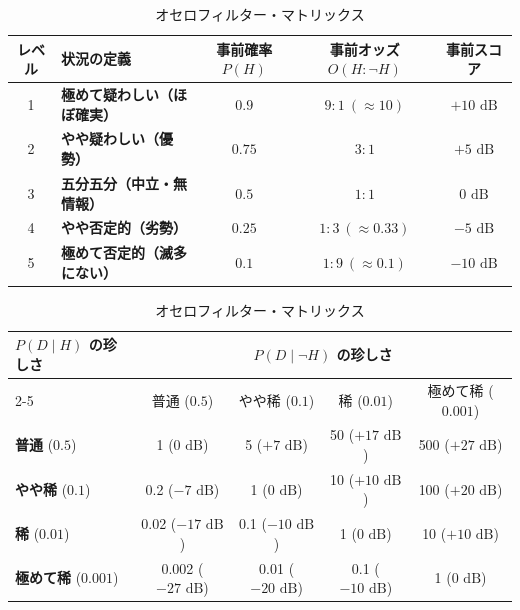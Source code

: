 \begin{table}
  \centering
  \small

  \caption{オセロフィルター 事前確率と事前オッズの5段階標準スケール}
  \label{tab:prior_odds_scale}
  \begin{tabular}{clccc}
    \toprule
    レベル & 状況の定義 & 事前確率 $P(H)$ & 事前オッズ $O(H : \neg H)$ & 事前スコア \\
    \midrule
    1 & \textbf{極めて疑わしい（ほぼ確実）} & $0.9$  & $9 : 1 \ (\approx 10)$  & $+10\text{ dB}$ \\
    2 & \textbf{やや疑わしい（優勢）}       & $0.75$ & $3 : 1$                 & $+5\text{ dB}$  \\
    3 & \textbf{五分五分（中立・無情報）}   & $0.5$  & $1 : 1$                 & $0\text{ dB}$   \\
    4 & \textbf{やや否定的（劣勢）}         & $0.25$ & $1 : 3 \ (\approx 0.33)$ & $-5\text{ dB}$  \\
    5 & \textbf{極めて否定的（滅多にない）} & $0.1$  & $1 : 9 \ (\approx 0.1)$  & $-10\text{ dB}$ \\
    \bottomrule
  \end{tabular}

  \vspace{1.8em} %

  \caption{オセロフィルター・マトリックス}
  \label{tab:othello_filter_matrix}
  \begin{tabular}{lcccc}
    \toprule
    \multirow{2}{*}{$P(D \mid H)$ の珍しさ} & \multicolumn{4}{c}{$P(D \mid \neg H)$ の珍しさ} \\
    \cmidrule(lr){2-5}
    & 普通 ($0.5$) & やや稀 ($0.1$) & 稀 ($0.01$) & 極めて稀 ($0.001$) \\
    \midrule
    \textbf{普通} ($0.5$)        & 1 ($0\text{ dB}$)       & 5 ($+7\text{ dB}$)      & 50 ($+17\text{ dB}$)  & 500 ($+27\text{ dB}$) \\
    \textbf{やや稀} ($0.1$)      & 0.2 ($-7\text{ dB}$)    & 1 ($0\text{ dB}$)       & 10 ($+10\text{ dB}$)  & 100 ($+20\text{ dB}$) \\
    \textbf{稀} ($0.01$)        & 0.02 ($-17\text{ dB}$)  & 0.1 ($-10\text{ dB}$)   & 1 ($0\text{ dB}$)     & 10 ($+10\text{ dB}$)  \\
    \textbf{極めて稀} ($0.001$)  & 0.002 ($-27\text{ dB}$) & 0.01 ($-20\text{ dB}$)  & 0.1 ($-10\text{ dB}$) & 1 ($0\text{ dB}$)     \\
    \bottomrule
  \end{tabular}


\end{table}



